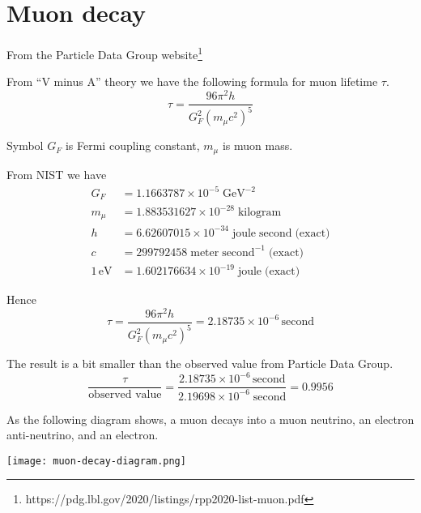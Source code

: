 

\section*{Muon decay}
From the Particle Data Group website\footnote{https://pdg.lbl.gov/2020/listings/rpp2020-list-muon.pdf}
\begin{center}
\end{center}

From ``V minus A'' theory we have the following formula for muon lifetime $\tau$.
\begin{equation*}
\tau=\frac{96\pi^2h}{G_F^2\left(m_\mu c^2\right)^5}
\end{equation*}

Symbol $G_F$ is Fermi coupling constant, $m_\mu$ is muon mass.

\bigskip
From NIST we have
\begin{align*}
G_F&=1.1663787\times10^{-5}\;\text{GeV}^{-2}
\\
m_\mu&=1.883531627\times10^{-28}\;\text{kilogram}
\\
h&=6.62607015\times10^{-34}\;\text{joule}\;\text{second}\;\text{(exact)}
\\
c&=299792458\;\text{meter}\;\text{second}^{-1}\;\text{(exact)}
\\
1\,\text{eV}&=1.602176634\times10^{-19}\;\text{joule}\;\text{(exact)}
\end{align*}

Hence
\begin{equation*}
\tau=\frac{96\pi^2h}{G_F^2\left(m_\mu c^2\right)^5}
=2.18735\times10^{-6}\,\text{second}
\end{equation*}

The result is a bit smaller than the observed value from Particle Data Group.
\begin{equation*}
\frac{\tau}{\text{observed value}}
=\frac{2.18735\times10^{-6}\,\text{second}}{2.19698\times10^{-6}\;\text{second}}=0.9956
\end{equation*}

As the following diagram shows, a muon decays into a muon neutrino, an electron anti-neutrino,
and an electron.
\begin{center}
\texttt{[image: muon-decay-diagram.png]}
\end{center}

